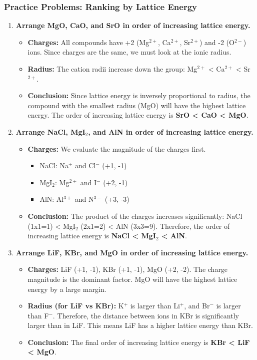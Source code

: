 \documentclass{article}
\begin{document}
\subsubsection*{Practice Problems: Ranking by Lattice Energy}
\begin{enumerate}[itemsep=5pt]
    \item \textbf{Arrange MgO, CaO, and SrO in order of increasing lattice energy.}
    \begin{itemize}
        \item \textbf{Charges:} All compounds have +2 (Mg\(^{2+}\), Ca\(^{2+}\), Sr\(^{2+}\)) and -2 (O\(^{2-}\)) ions. Since charges are the same, we must look at the ionic radius.
        \item \textbf{Radius:} The cation radii increase down the group: Mg\(^{2+}\) < Ca\(^{2+}\) < Sr\(^{2+}\).
        \item \textbf{Conclusion:} Since lattice energy is inversely proportional to radius, the compound with the smallest radius (MgO) will have the highest lattice energy. The order of increasing lattice energy is \textbf{SrO < CaO < MgO}.
    \end{itemize}
    \item \textbf{Arrange NaCl, MgI\(_2\), and AlN in order of increasing lattice energy.}
    \begin{itemize}
        \item \textbf{Charges:} We evaluate the magnitude of the charges first.
        \begin{itemize}
            \item NaCl: Na\(^{+}\) and Cl\(^{-}\) (+1, -1)
            \item MgI\(_2\): Mg\(^{2+}\) and I\(^{-}\) (+2, -1)
            \item AlN: Al\(^{3+}\) and N\(^{3-}\) (+3, -3)
        \end{itemize}
        \item \textbf{Conclusion:} The product of the charges increases significantly: NaCl (1x1=1) < MgI\(_2\) (2x1=2) < AlN (3x3=9). Therefore, the order of increasing lattice energy is \textbf{NaCl < MgI\(_2\) < AlN}.
    \end{itemize}
     \item \textbf{Arrange LiF, KBr, and MgO in order of increasing lattice energy.}
    \begin{itemize}
        \item \textbf{Charges:} LiF (+1, -1), KBr (+1, -1), MgO (+2, -2). The charge magnitude is the dominant factor. MgO will have the highest lattice energy by a large margin.
        \item \textbf{Radius (for LiF vs KBr):} K\(^+\) is larger than Li\(^+\), and Br\(^-\) is larger than F\(^-\). Therefore, the distance between ions in KBr is significantly larger than in LiF. This means LiF has a higher lattice energy than KBr.
        \item \textbf{Conclusion:} The final order of increasing lattice energy is \textbf{KBr < LiF < MgO}.
    \end{itemize}
\end{enumerate}
\end{document}
